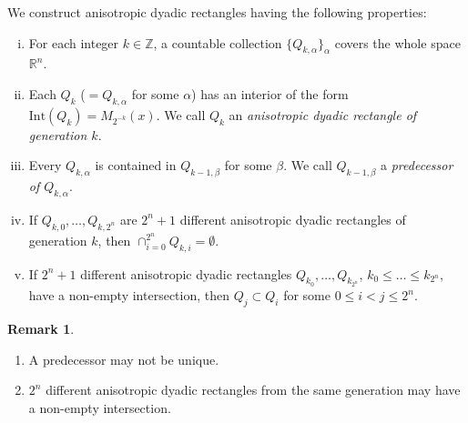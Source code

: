\documentclass[11pt]{amsart}
\theoremstyle{plain}
\theoremstyle{definition}
\newtheorem{remark}[theorem]{Remark}
\numberwithin{equation}{section}
\begin{document}
\begin{appendix}
We construct anisotropic dyadic rectangles having the following properties:
\begin{enumerate}[(i)]
\item
For each integer $k \in \mathbb{Z}$, a countable collection $\lbrace Q_{k, \alpha} \rbrace_\alpha$ covers the whole space $\mathbb{R}^n$.
\item
Each $Q_k$ ($= Q_{k, \alpha}$ for some $\alpha$) has an interior of the form $\mathrm{Int}(Q_k) = M_{2^{-k}}(x)$. We call $Q_k$ an {\it anisotropic dyadic rectangle of generation $k$}.
\item
Every $Q_{k, \alpha}$ is contained in $Q_{k-1, \beta}$ for some $\beta$. We call $Q_{k-1, \beta}$ a {\it predecessor of $Q_{k, \alpha}$}.
\item
If $Q_{k, 0}, \dots, Q_{k, 2^n}$ are $2^n+1$ different anisotropic dyadic rectangles of generation $k$, then $\cap_{i=0}^{2^n} Q_{k, i} = \emptyset$.
\item
If $2^n+1$ different anisotropic dyadic rectangles $Q_{k_0}, \dots, Q_{k_{2^n}}$, $k_0 \leq \dots \leq k_{2^n}$, have a non-empty intersection, then $Q_j \subset Q_i$ for some $0 \leq i < j \leq 2^n$.
\end{enumerate}

\begin{remark} {\ }
\begin{enumerate}
\item
A predecessor may not be unique.
\item
$2^n$ different anisotropic dyadic rectangles from the same generation may have a non-empty intersection.
\end{enumerate}
\end{remark}


\end{appendix}
\end{document}
